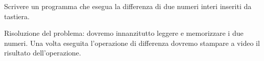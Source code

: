 \begin{Exercise}[label={ex:difference}]
	Scrivere un programma che esegua la differenza di due numeri interi inseriti da tastiera.
\end{Exercise}

\begin{Answer}[ref={ex:difference}]
	Risoluzione del problema: dovremo innanzitutto leggere e memorizzare i due numeri. Una volta eseguita l'operazione di differenza dovremo stampare a video il risultato dell'operazione.
	
  
\end{Answer}
